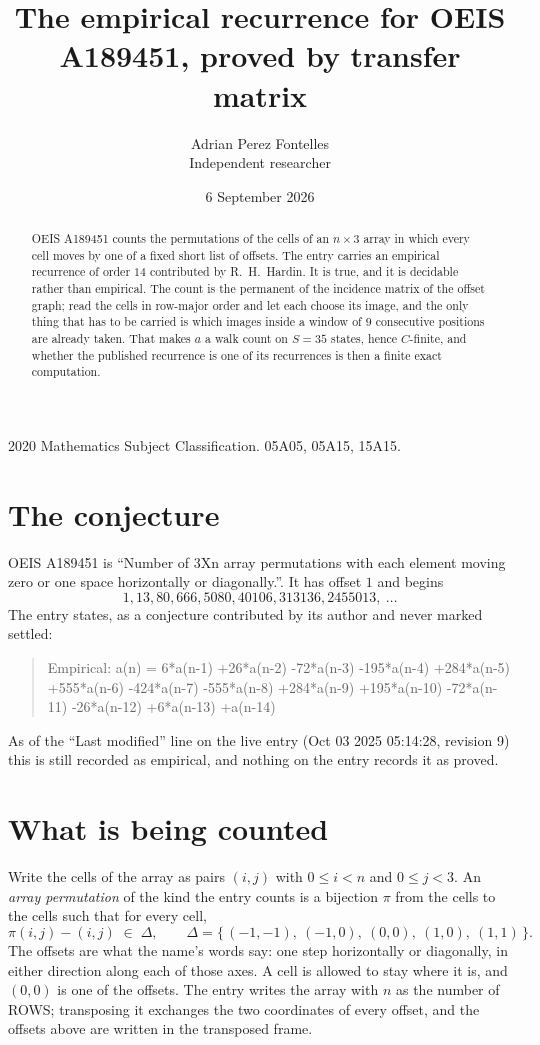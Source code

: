 \documentclass[11pt,a4paper]{article}
\title{The empirical recurrence for OEIS A189451, proved by transfer matrix}
\author{Adrian Perez Fontelles\\ \small Independent researcher}
\date{6 September 2026}
\theoremstyle{plain}
\theoremstyle{definition}
\begin{document}
\maketitle

\begin{abstract}
OEIS A189451 counts the permutations of the cells of an $n\times3$ array in which every cell
moves by one of a fixed short list of offsets. The entry carries an empirical recurrence of
order $14$ contributed by R.~H.~Hardin. It is true, and it is decidable rather than
empirical. The count is the permanent of the incidence matrix of the offset graph; read the
cells in row-major order and let each choose its image, and the only thing that has to be
carried is which images inside a window of $9$ consecutive positions are already taken.
That makes $a$ a walk count on $S=35$ states, hence $C$-finite, and whether the published
recurrence is one of its recurrences is then a finite exact computation.
\end{abstract}

\noindent\small 2020 Mathematics Subject Classification. 05A05, 05A15, 15A15.\normalsize

\section{The conjecture}

OEIS A189451 is ``Number of 3Xn array permutations with each element moving zero or one space horizontally or diagonally.''. It has offset $1$ and begins
\[
1, 13, 80, 666, 5080, 40106, 313136, 2455013,\ \dots
\]
The entry states, as a conjecture contributed by its author and never marked settled:
\begin{quote}
Empirical: a(n) = 6*a(n-1) +26*a(n-2) -72*a(n-3) -195*a(n-4) +284*a(n-5) +555*a(n-6) -424*a(n-7) -555*a(n-8) +284*a(n-9) +195*a(n-10) -72*a(n-11) -26*a(n-12) +6*a(n-13) +a(n-14)
\end{quote}
As of the ``Last modified'' line on the live entry (Oct 03 2025 05:14:28, revision 9) this is still
recorded as empirical, and nothing on the entry records it as proved.

\section{What is being counted}

Write the cells of the array as pairs $(i,j)$ with $0\le i<n$ and $0\le j<3$. An
\emph{array permutation} of the kind the entry counts is a bijection $\pi$ from the cells to
the cells such that for every cell,
\[
\pi(i,j)-(i,j)\;\in\;\Delta,\qquad
\Delta=\{\,(-1,-1),\ (-1,0),\ (0,0),\ (1,0),\ (1,1)\,\}.
\]
The offsets are what the name's words say: one step horizontally or diagonally, in either direction along each of those axes. A cell is allowed to stay where it is, and $(0,0)$ is one of the offsets. The entry writes the array with $n$ as the number of ROWS; transposing it exchanges the two coordinates of every offset, and the offsets above are written in the transposed frame.
\end{document}
